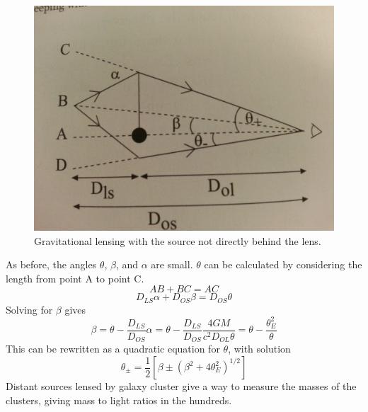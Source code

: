 \begin{figure}[!h]
\begin{center}
\includegraphics[width=\textwidth]{lens2.jpg}
\end{center}
\caption{Gravitational lensing with the source not directly behind the lens.  
\label{fig:lens2}}
\end{figure}

As before, the angles $\theta$, $\beta$, and $\alpha$ are small.  $\theta$ can 
be calculated by considering the length from point A to point C.  
\begin{equation}
AB+BC=AC
\end{equation}
\begin{equation}
D_{LS}\alpha+D_{OS}\beta=D_{OS}\theta
\end{equation}
Solving for $\beta$ gives
\begin{equation}
\beta=\theta-\frac{D_{LS}}{D_{OS}}\alpha=\theta-\frac{D_{LS}}{D_{OS}}\frac{4GM}{c^2D_{OL}\theta}=\theta-\frac{\theta_E^2}{\theta}
\end{equation}
This can be rewritten as a quadratic equation for $\theta$, with solution 
\begin{equation}
\theta_{\pm}=\frac{1}{2}[\beta\pm(\beta^2+4\theta_E^2)^{1/2}]
\end{equation}
Distant sources lensed by galaxy cluster give a way to measure the masses 
of the clusters, giving mass to light ratios in the hundreds.  

